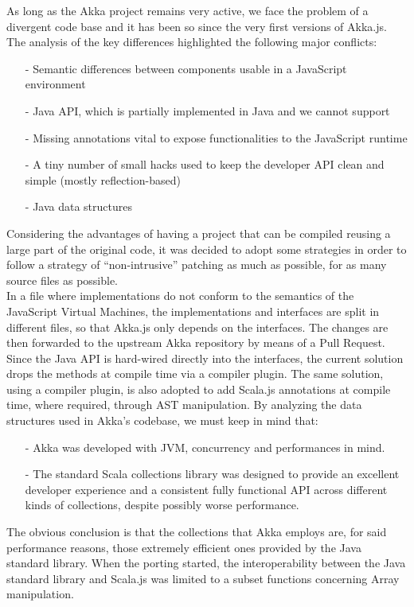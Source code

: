 \documentclass{sig-alternate}
\begin{document}
As long as the Akka project remains very active, we face the problem of a divergent code base and it has been so since the very first versions of Akka.js.
The analysis of the key differences highlighted the following major conflicts:
\begin{itemize}
	\item[-] Semantic differences between components usable in a JavaScript environment
	\item[-] Java API, which is partially implemented in Java and we cannot support
	\item[-] Missing annotations vital to expose functionalities to the JavaScript runtime
	\item[-] A tiny number of small hacks used to keep the developer API clean and simple (mostly reflection-based)
	\item[-] Java data structures
\end{itemize}
Considering the advantages of having a project that can be compiled reusing a large part of the original code, it was decided to adopt some strategies in order to follow a strategy of ``non-intrusive'' patching as much as possible, for as many source files as possible.
\\
In a file where implementations do not conform to the semantics of the JavaScript Virtual Machines, the implementations and interfaces are split in different files, so that Akka.js only depends on the interfaces. The changes are then forwarded to the upstream Akka repository by means of a Pull Request.
Since the Java API is hard-wired directly into the interfaces, the current solution drops the methods at compile time via a compiler plugin.
The same solution, using a compiler plugin, is also adopted to add Scala.js annotations at compile time, where required, through AST manipulation.
By analyzing the data structures used in Akka's codebase, we must keep in mind that:
\begin{itemize}
	\item[-] Akka was developed with JVM, concurrency and performances in mind.
	\item[-] The standard Scala collections library was designed to provide an excellent developer experience and a consistent fully functional API across different kinds of collections, despite possibly worse performance.
\end{itemize}
The obvious conclusion is that the collections that Akka employs are, for said performance reasons, those extremely efficient ones provided by the Java standard library.
When the porting started, the interoperability between the Java standard library and Scala.js was limited to a subset functions concerning Array manipulation.
\end{document}
